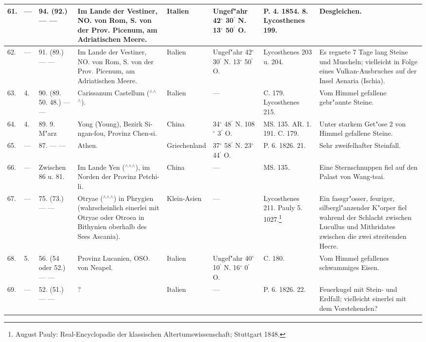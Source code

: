 \documentclass[a4paper, 8pt, oneside, polutonikogreek, german]{article}
\begin{document}
\begin{center}
\begin{longtable}{| p{4mm} | p{2mm} | p{15mm} | p{25mm} | p{16mm} | p{12mm} | p{13mm} | p{20mm} |}
        61. & --- & 94. (92.) --- --- & Im Lande der Vestiner, NO. von Rom, S. von der Prov. Picenum, am Adriatischen Meere. & Italien & Ungef"ahr 42$^\circ$ 30$^\prime$ N. 13$^\circ$ 50$^\prime$ O. & P. 4. 1854. 8. Lycosthenes 199. & Desgleichen. \\ \hline
        62. & --- & 91. (89.) --- --- & Im Lande der Vestiner, NO. von Rom, S. von der Prov. Picenum, am Adriatischen Meere. & Italien & Ungef"ahr 42$^\circ$ 30$^\prime$ N. 13$^\circ$ 50$^\prime$ O. & Lycosthenes 203 u. 204. & Es regnete 7 Tage lang Steine und Muscheln; vielleicht in Folge eines Vulkan-Ausbruches auf der Insel Aenaria (Ischia). \\ \hline
        63. & 4. & 90. (89. 50. 48.) --- --- & Carissanum Castellum ($^\wedge$$^\wedge$$^\wedge$). & Italien & --- & C. 179. Lycosthenes 215. & Vom Himmel gefallene gebr"aunte Steine. \\ \hline
        64. & 4. & 89. 9. M"arz & Yong (Young), Bezirk Si-ngan-fou, Provinz Chen-si. & China & 34$^\circ$ 48$^\prime$ N. 108$^\circ$ 3$^\prime$ O. & MS. 135. AR. 1. 191. C. 179. & Unter starkem Get"ose 2 von Himmel gefallene Steine. \\ \hline
        65. & --- & 87. --- --- & Athen. & Griechenland & 37$^\circ$ 58$^\prime$ N. 23$^\circ$ 44$^\prime$ O. & P. 6. 1826. 21. & Sehr zweifelhafter Steinfall. \\ \hline
        66. & --- & Zwischen 86 u. 81. & Im Lande Yen ($^\wedge$$^\wedge$$^\wedge$), im Norden der Provinz Petchi-li. & China & --- & MS. 135. & Eine Sternschnuppen fiel auf den Palast von Wang-tsai. \\ \hline
        67. & --- & 75. (73.) --- --- & Otryae ($^\wedge$$^\wedge$$^\wedge$) in Phrygien (wahrscheinlich einerlei mit Otryae oder Otroea in Bithynien oberhalb des Sees Ascania). & Klein-Asien & --- & Lycosthenes 211. Pauly 5. 1027.\footnote{August Pauly: Real-Encyclopadie der klassischen Altertumswissenschaft; Stuttgart 1848.} & Ein fassgr"osser, feuriger, silbergl"anzender K"orper fiel wahrend der Schlacht zwischen Lucullus und Mithridates zwischen die zwei streitenden Hecre. \\ \hline
        68. & 5. & 56. (54 oder 52.) --- --- & Provinz Lucanien, OSO. von Neapel. & Italien & Ungef"ahr 40$^\circ$ 10$^\prime$ N. 16$^\circ$ 0$^\prime$ O. & C. 180. & Vom Himmel gefallenes schwammiges Eisen. \\ \hline
        69. & --- & 52. (51.) --- --- & ? & Italien & --- & P. 6. 1826. 22. & Feuerkugel mit Stein- und Erdfall; vielleicht einerlei mit dem Vorstehenden? \\ \hline

\end{longtable}
\end{center}
\end{document}
